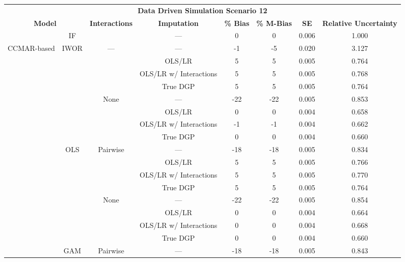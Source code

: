 \begin{table}
\centering
\begin{tabular}[ht]{|>{}c|c|c|c|c|c|c|>{}c|}
\hline
\multicolumn{8}{|c|}{\textbf{Data Driven Simulation Scenario 12}} \\
\cline{1-8}
\multicolumn{2}{|c|}{\textbf{Model}} & \textbf{Interactions} & \textbf{Imputation} & \textbf{\% Bias} & \textbf{\% M-Bias} & \textbf{SE} & \textbf{Relative Uncertainty}\\
\hline
 & IF &  & --- & 0 & 0 & 0.006 & 1.000\\
\cline{2-2}
\cline{4-8}
\multirow{-2}{*}{\centering\arraybackslash CCMAR-based} & IWOR & \multirow{-2}{*}{\centering\arraybackslash ---} & --- & -1 & -5 & 0.020 & 3.127\\
\cline{1-8}
 &  &  & OLS/LR & 5 & 5 & 0.005 & 0.764\\
\cline{4-8}
 &  &  & OLS/LR w/ Interactions & 5 & 5 & 0.005 & 0.768\\
\cline{4-8}
 &  &  & True DGP & 5 & 5 & 0.005 & 0.764\\
\cline{4-8}
 &  & \multirow{-4}{*}{\centering\arraybackslash None} & --- & -22 & -22 & 0.005 & 0.853\\
\cline{3-8}
 &  &  & OLS/LR & 0 & 0 & 0.004 & 0.658\\
\cline{4-8}
 &  &  & OLS/LR w/ Interactions & -1 & -1 & 0.004 & 0.662\\
\cline{4-8}
 &  &  & True DGP & 0 & 0 & 0.004 & 0.660\\
\cline{4-8}
 & \multirow{-8}{*}{\centering\arraybackslash OLS} & \multirow{-4}{*}{\centering\arraybackslash Pairwise} & --- & -18 & -18 & 0.005 & 0.834\\
\cline{2-8}
 &  &  & OLS/LR & 5 & 5 & 0.005 & 0.766\\
\cline{4-8}
 &  &  & OLS/LR w/ Interactions & 5 & 5 & 0.005 & 0.770\\
\cline{4-8}
 &  &  & True DGP & 5 & 5 & 0.005 & 0.764\\
\cline{4-8}
 &  & \multirow{-4}{*}{\centering\arraybackslash None} & --- & -22 & -22 & 0.005 & 0.854\\
\cline{3-8}
 &  &  & OLS/LR & 0 & 0 & 0.004 & 0.664\\
\cline{4-8}
 &  &  & OLS/LR w/ Interactions & 0 & 0 & 0.004 & 0.668\\
\cline{4-8}
 &  &  & True DGP & 0 & 0 & 0.004 & 0.660\\
\cline{4-8}
 & \multirow{-8}{*}{\centering\arraybackslash GAM} & \multirow{-4}{*}{\centering\arraybackslash Pairwise} & --- & -18 & -18 & 0.005 & 0.843\\

\end{tabular}
\end{table}
